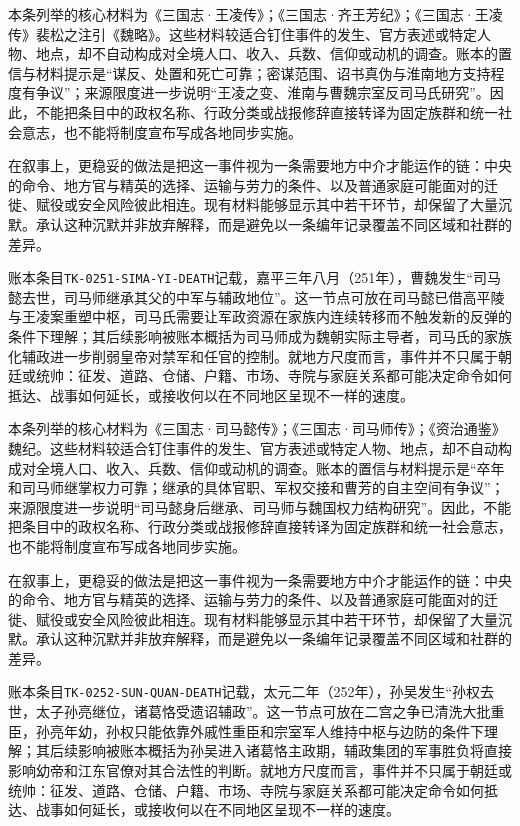 本条列举的核心材料为《三国志·王凌传》；《三国志·齐王芳纪》；《三国志·王凌传》裴松之注引《魏略》。这些材料较适合钉住事件的发生、官方表述或特定人物、地点，却不自动构成对全境人口、收入、兵数、信仰或动机的调查。账本的置信与材料提示是“谋反、处置和死亡可靠；密谋范围、诏书真伪与淮南地方支持程度有争议”；来源限度进一步说明“王凌之变、淮南与曹魏宗室反司马氏研究”。因此，不能把条目中的政权名称、行政分类或战报修辞直接转译为固定族群和统一社会意志，也不能将制度宣布写成各地同步实施。

在叙事上，更稳妥的做法是把这一事件视为一条需要地方中介才能运作的链：中央的命令、地方官与精英的选择、运输与劳力的条件、以及普通家庭可能面对的迁徙、赋役或安全风险彼此相连。现有材料能够显示其中若干环节，却保留了大量沉默。承认这种沉默并非放弃解释，而是避免以一条编年记录覆盖不同区域和社群的差异。

账本条目\texttt{TK-0251-SIMA-YI-DEATH}记载，嘉平三年八月（251年），曹魏发生“司马懿去世，司马师继承其父的中军与辅政地位”。这一节点可放在司马懿已借高平陵与王凌案重塑中枢，司马氏需要让军政资源在家族内连续转移而不触发新的反弹的条件下理解；其后续影响被账本概括为司马师成为魏朝实际主导者，司马氏的家族化辅政进一步削弱皇帝对禁军和任官的控制。就地方尺度而言，事件并不只属于朝廷或统帅：征发、道路、仓储、户籍、市场、寺院与家庭关系都可能决定命令如何抵达、战事如何延长，或接收何以在不同地区呈现不一样的速度。

本条列举的核心材料为《三国志·司马懿传》；《三国志·司马师传》；《资治通鉴》魏纪。这些材料较适合钉住事件的发生、官方表述或特定人物、地点，却不自动构成对全境人口、收入、兵数、信仰或动机的调查。账本的置信与材料提示是“卒年和司马师继掌权力可靠；继承的具体官职、军权交接和曹芳的自主空间有争议”；来源限度进一步说明“司马懿身后继承、司马师与魏国权力结构研究”。因此，不能把条目中的政权名称、行政分类或战报修辞直接转译为固定族群和统一社会意志，也不能将制度宣布写成各地同步实施。

在叙事上，更稳妥的做法是把这一事件视为一条需要地方中介才能运作的链：中央的命令、地方官与精英的选择、运输与劳力的条件、以及普通家庭可能面对的迁徙、赋役或安全风险彼此相连。现有材料能够显示其中若干环节，却保留了大量沉默。承认这种沉默并非放弃解释，而是避免以一条编年记录覆盖不同区域和社群的差异。

账本条目\texttt{TK-0252-SUN-QUAN-DEATH}记载，太元二年（252年），孙吴发生“孙权去世，太子孙亮继位，诸葛恪受遗诏辅政”。这一节点可放在二宫之争已清洗大批重臣，孙亮年幼，孙权只能依靠外戚性重臣和宗室军人维持中枢与边防的条件下理解；其后续影响被账本概括为孙吴进入诸葛恪主政期，辅政集团的军事胜负将直接影响幼帝和江东官僚对其合法性的判断。就地方尺度而言，事件并不只属于朝廷或统帅：征发、道路、仓储、户籍、市场、寺院与家庭关系都可能决定命令如何抵达、战事如何延长，或接收何以在不同地区呈现不一样的速度。

